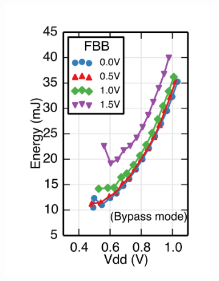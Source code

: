 \documentclass[graybox]{svmult}
\begin{document}
\begin{figure}
\begin{subfigure}[t]{0.23\textwidth}
  \includegraphics[width=\textwidth]{6-raven3-shmoo-b}
  \caption{}
  \label{fig:6-raven3-shmoo-b}
  \end{subfigure}
  \hspace*{\fill}
  \begin{subfigure}[t]{0.23\textwidth}
  \centering

\end{subfigure}
\end{figure}
\end{document}
